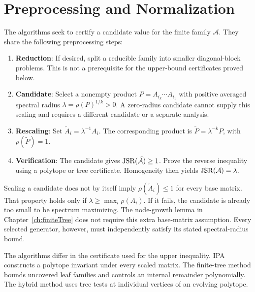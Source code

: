 \section{Preprocessing and Normalization}
\label{sec:introPreprocessing}
The algorithms seek to certify a candidate value for the finite family $\mathcal{A}$.
They share the following preprocessing steps:
\begin{enumerate}
    \item \textbf{Reduction}: If desired, split a reducible family into smaller diagonal-block problems.
    This is not a prerequisite for the upper-bound certificates proved below.
    \item \textbf{Candidate}: Select a nonempty product $P=A_{i_k}\cdots A_{i_1}$ with positive averaged spectral radius $\lambda=\rho(P)^{1/k}>0$.
    A zero-radius candidate cannot supply this scaling and requires a different candidate or a separate analysis.
    \item \textbf{Rescaling}: Set $\tilde{A}_i=\lambda^{-1}A_i$.
    The corresponding product is $\tilde{P}=\lambda^{-k}P$, with $\rho(\tilde{P})=1$.
    \item \textbf{Verification}: The candidate gives $\operatorname{JSR}(\tilde{\mathcal{A}})\geq1$.
    Prove the reverse inequality using a polytope or tree certificate.
    Homogeneity then yields $\operatorname{JSR}(\mathcal{A})=\lambda$.
\end{enumerate}

Scaling a candidate does not by itself imply $\rho(\tilde{A}_i)\leq1$ for every base matrix.
That property holds only if $\lambda\geq\max_i\rho(A_i)$.
If it fails, the candidate is already too small to be spectrum maximizing.
The node-growth lemma in Chapter~\ref{ch:finiteTree} does not require this extra base-matrix assumption.
Every selected generator, however, must independently satisfy its stated spectral-radius bound.

The algorithms differ in the certificate used for the upper inequality.
IPA constructs a polytope invariant under every scaled matrix.
The finite-tree method bounds uncovered leaf families and controls an internal remainder polynomially.
The hybrid method uses tree tests at individual vertices of an evolving polytope.
